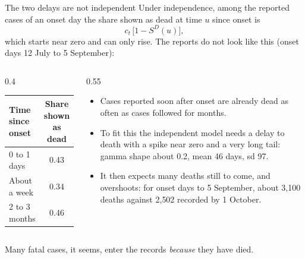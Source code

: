 \documentclass[aspectratio=169,9pt]{beamer}
\begin{document}
\begin{frame}{The two delays are not independent}
Under independence, among the reported cases of an onset day the share
shown as dead at time $u$ since onset is
\[
c_t\,\bigl[1-S^{D}(u)\bigr],
\]
which starts near zero and can only rise. The reports do not look like this
(onset days 12 July to 5 September):

\begin{columns}[c]
\begin{column}{0.4\textwidth}
\centering
\renewcommand{\arraystretch}{1.25}
\begin{tabular}{lc}
\toprule
Time since onset & Share shown as dead \\
\midrule
0 to 1 days & 0.43 \\
About a week & 0.34 \\
2 to 3 months & 0.46 \\
\bottomrule
\end{tabular}
\end{column}
\begin{column}{0.55\textwidth}
\begin{itemize}
\item Cases reported soon after onset are already dead as often as cases
followed for months.
\item To fit this the independent model needs a delay to death with a spike
near zero and a very long tail: gamma shape about 0.2, mean 46 days, sd 97.
\item It then expects many deaths still to come, and overshoots: for onset
days to 5 September, about 3{,}100 deaths against 2{,}502 recorded by
1 October.
\end{itemize}
\end{column}
\end{columns}

\bigskip
Many fatal cases, it seems, enter the records \emph{because} they have died.
\end{frame}
\end{document}
